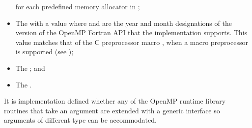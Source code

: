 \begin{fortranspecific}
\begin{itemize}
       for each predefined memory allocator 
      in ;
\item The    with 
      a value  where  and  are the year 
      and month designations of the version of the OpenMP Fortran
      API that the implementation supports. This value matches that 
      of the C preprocessor macro , when a macro 
      preprocessor is supported (see );
\item The   ; and
\item The   .
\end{itemize}

It is implementation defined whether any of the OpenMP runtime library 
routines that take an argument are extended with a generic interface so 
arguments of different  type can be accommodated. 
\end{fortranspecific}







